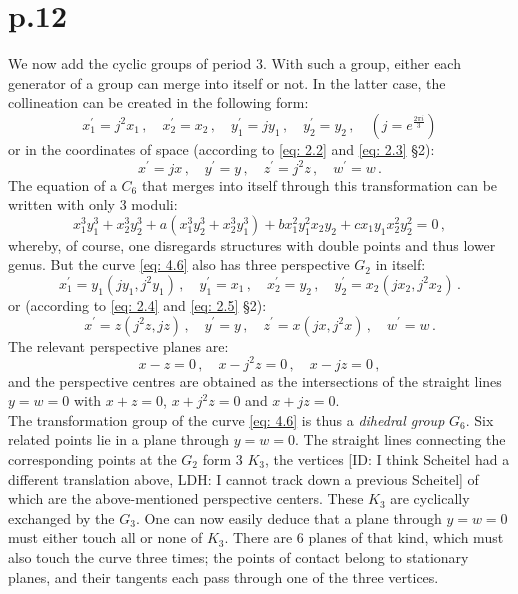 \documentclass[leqno]{article}
\begin{document}
\section{p.12}
We now add the cyclic groups of period 3. With such a group, either each generator of a group can merge into itself or not. In the latter case, the collineation can be created in the following form: 
\[
x_1^\prime = j^2 x_1 \, , \quad x_2^\prime = x_2 \, , \quad y_1^\prime = j y_1 \, , \quad y_2^\prime = y_2 \, , \quad \left( j = e^{\frac{2 \pi i}{3}} \right)
\] 
or in the coordinates of space (according to \eqref{eq: 2.2} and \eqref{eq: 2.3} \S 2):
\[
x^\prime = jx \, , \quad y^\prime = y \, , \quad z^\prime = j^2 z \, , \quad w^\prime = w \, . 
\]
The equation of a $C_6$ that merges into itself through this transformation can be written with only 3 moduli:
\begin{equation}\label{eq: 4.6}
x_1^3 y_1^3 + x_2^3 y_2^3 + a(x_1^3 y_2^3 + x_2^3 y_1^3) + b x_1^2 y_1^2 x_2 y_2 + c x_1 y_1 x_2^2 y_2^2 = 0 \, , \tag{6}
\end{equation}
whereby, of course, one disregards structures with double points and thus lower genus. But the curve \eqref{eq: 4.6} also has three perspective $G_2$ in itself: 
\[      
x_1^\prime = y_1 (j y_1 , j^2 y_1) \, , \quad y_1^\prime = x_1 \, , \quad x_2^\prime = y_2 \, , \quad y_2^\prime = x_2 (j x_2, j^2 x_2) \, .  
\]
or (according to \eqref{eq: 2.4} and \eqref{eq: 2.5} \S 2):
\[
x^\prime = z(j^2z, jz) \, , \quad y^\prime = y \, , \quad z^\prime = x(jx, j^2x) \, , \quad w^\prime = w \, . 
\]
The relevant perspective planes are: 
\[
x-z=0 \, , \quad x-j^2z=0 \, , \quad x-jz=0 \, , 
\] 
and the perspective centres are obtained as the intersections of the straight lines $y=w=0$ with $x+z=0$, $x+j^2z=0$ and $x+jz=0 $. \\
The transformation group of the curve \eqref{eq: 4.6} is thus a \textit{dihedral group} $G_6$. Six related points lie in a plane through $y=w=0$. The straight lines connecting the corresponding points at the $G_2$ form 3 $K_3$, the vertices [ID: I think Scheitel had a different translation above, LDH: I cannot track down a previous Scheitel] of which are the above-mentioned perspective centers. These $K_3$ are cyclically exchanged by the $G_3$. One can now easily deduce that a plane through $y=w=0$ must either touch all or none of $K_3$. There are 6 planes of that kind, which must also touch the curve three times; the points of contact belong to stationary planes, and their tangents each pass through one of the three vertices. \\
\end{document}
